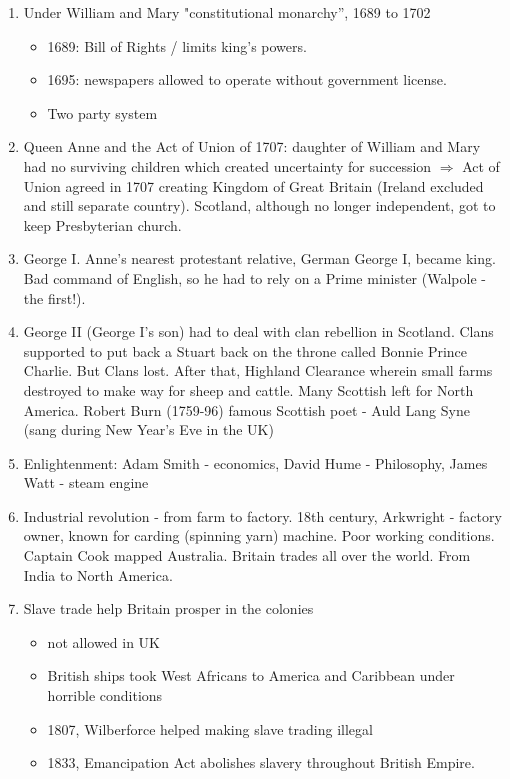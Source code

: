 \documentclass{amsart}
\begin{document}
\begin{enumerate}
	\item Under William and Mary "constitutional monarchy'', 1689 to 1702
		\begin{itemize}
			\item 1689: Bill of Rights / limits king's powers. 
			\item 1695: newspapers allowed to operate without government license.
			\item Two party system 
		\end{itemize}
	\item Queen Anne and the Act of Union of 1707: daughter of William and Mary had no surviving children which created uncertainty for succession $\Rightarrow$  Act of Union agreed in 1707 creating Kingdom of Great Britain (Ireland excluded and still separate country). Scotland, although no longer independent, got to keep Presbyterian church. 
	\item George I. Anne's nearest protestant relative, German George I, became king. Bad command of English, so he had to rely on a Prime minister (Walpole - the first!).
	\item George II (George I's son) had to deal with clan rebellion in Scotland. Clans supported to put back a Stuart back on the throne called Bonnie Prince Charlie. But Clans lost. After that, Highland Clearance wherein small farms destroyed to make way for sheep and cattle. Many Scottish left for North America. Robert Burn (1759-96) famous Scottish poet - Auld Lang Syne (sang during New Year's Eve in the UK)
	\item Enlightenment: 
Adam Smith - economics, David Hume - Philosophy, James Watt - steam engine 
	\item Industrial revolution - from farm to factory. 18th century, Arkwright - factory owner, known for carding (spinning yarn) machine. 
Poor working conditions.  Captain Cook mapped Australia. Britain trades all over the world. From India to North America. 
	\item Slave trade help Britain prosper in the colonies
			\begin{itemize}
				\item not allowed in UK
				\item British ships took West Africans to America and Caribbean under horrible conditions
				\item 1807, Wilberforce helped making slave trading illegal
				\item 1833, Emancipation Act abolishes slavery throughout British Empire.

\end{itemize}
\end{enumerate}
\end{document}
